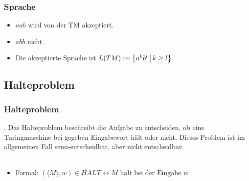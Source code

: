 \begin{frame}
 \frametitle{Sprache}
 \begin{itemize}
  \item $aab$ wird von der TM akzeptiert.
  \item $abb$ nicht.
  \item Die akzeptierte Sprache ist $L(TM) := \left\lbrace a^kb^l \,\middle\vert\, k \geq l \right\rbrace$
 

 \hfill 
 \resizebox{8cm}{!} {%
  \thetm
 }
  \invincible
  \pause
 \ducttape{-6cm} 
  \vincible
 \end{itemize}
 
\end{frame}

\subsection{Halteproblem}
\begin{frame}
	\frametitle{Halteproblem}.
	Das Halteproblem beschreibt die Aufgabe zu entscheiden, ob eine Turingmaschine bei gegeben Eingabewort hält oder nicht. Dieses Problem ist im allgemeinen Fall semi-entscheidbar, aber nicht entscheidbar.~\\~\\
	\begin{itemize}
		\item Formal: $(\langle M\rangle, w) \in HALT \Leftrightarrow M \text{ hält bei der Eingabe } w$
	\end{itemize}
\end{frame}


